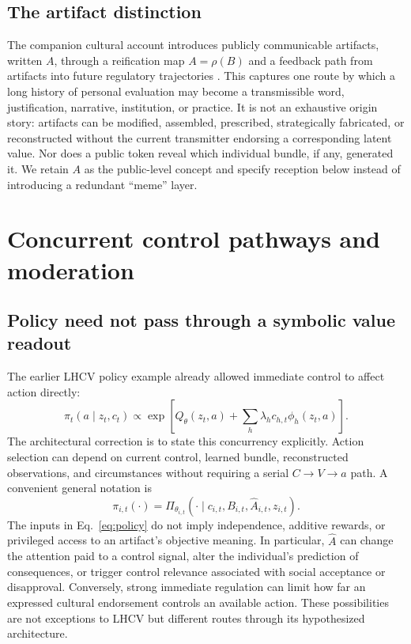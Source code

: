 \documentclass[11pt,a4paper]{article}
\begin{document}
\subsection{The artifact distinction}
The companion cultural account introduces publicly communicable artifacts, written $A$, through a reification map $A=\rho(B)$ and a feedback path from artifacts into future regulatory trajectories \citep{zarnckeDrift}. This captures one route by which a long history of personal evaluation may become a transmissible word, justification, narrative, institution, or practice. It is not an exhaustive origin story: artifacts can be modified, assembled, prescribed, strategically fabricated, or reconstructed without the current transmitter endorsing a corresponding latent value. Nor does a public token reveal which individual bundle, if any, generated it. We retain $A$ as the public-level concept and specify reception below instead of introducing a redundant ``meme'' layer.

\section{Concurrent control pathways and moderation}
\subsection{Policy need not pass through a symbolic value readout}
The earlier LHCV policy example already allowed immediate control to affect action directly:
\begin{equation}
 \pi_t(a\mid z_t,c_t)\propto\exp\!\left[Q_\theta(z_t,a)+\sum_h\lambda_h c_{h,t}\phi_h(z_t,a)\right].
 \label{eq:oldpolicy}
\end{equation}
The architectural correction is to state this concurrency explicitly. Action selection can depend on current control, learned bundle, reconstructed observations, and circumstances without requiring a serial $C\to V\to a$ path. A convenient general notation is
\begin{equation}
 \pi_{i,t}(\cdot)=\Pi_{\theta_{i,t}}(\cdot\mid c_{i,t},B_{i,t},\widehat A_{i,t},z_{i,t}).
 \label{eq:policy}
\end{equation}
The inputs in Eq.~\eqref{eq:policy} do not imply independence, additive rewards, or privileged access to an artifact's objective meaning. In particular, $\widehat A$ can change the attention paid to a control signal, alter the individual's prediction of consequences, or trigger control relevance associated with social acceptance or disapproval. Conversely, strong immediate regulation can limit how far an expressed cultural endorsement controls an available action. These possibilities are not exceptions to LHCV but different routes through its hypothesized architecture.
\end{document}
